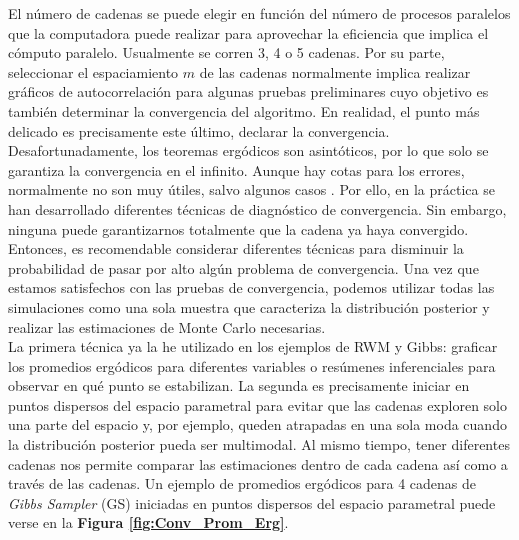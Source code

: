 El número de cadenas se puede elegir en función del número de procesos paralelos que la computadora puede realizar para aprovechar la eficiencia que implica el cómputo paralelo. Usualmente se corren 3, 4 o 5 cadenas. Por su parte, seleccionar el espaciamiento $m$ de las cadenas normalmente implica realizar gráficos de autocorrelación para algunas pruebas preliminares cuyo objetivo es también determinar la convergencia del algoritmo. En realidad, el punto más delicado es precisamente este último, declarar la convergencia.\\ 

Desafortunadamente, los teoremas ergódicos son asintóticos, por lo que solo se garantiza la convergencia en el infinito. Aunque hay cotas para los errores, normalmente no son muy útiles, salvo algunos casos \parencite{SmithRoberts93}. Por ello, en la práctica se han desarrollado diferentes técnicas de diagnóstico de convergencia. Sin embargo, ninguna puede garantizarnos totalmente que la cadena ya haya convergido. Entonces, es recomendable considerar diferentes técnicas para disminuir la probabilidad de pasar por alto algún problema de convergencia. Una vez que estamos satisfechos con las pruebas de convergencia, podemos utilizar todas las simulaciones como una sola muestra que caracteriza la distribución posterior y realizar las estimaciones de Monte Carlo necesarias.\\

La primera técnica ya la he utilizado en los ejemplos de RWM y Gibbs: graficar los promedios ergódicos para diferentes variables o resúmenes inferenciales para observar en qué punto se estabilizan. La segunda es precisamente iniciar en puntos dispersos del espacio parametral para evitar que las cadenas exploren solo una parte del espacio y, por ejemplo, queden atrapadas en una sola moda cuando la distribución posterior pueda ser multimodal. Al mismo tiempo, tener diferentes cadenas nos permite comparar las estimaciones dentro de cada cadena así como a través de las cadenas. Un ejemplo de promedios ergódicos para 4 cadenas de \textit{Gibbs Sampler} (GS) iniciadas en puntos dispersos del espacio parametral puede verse en la \textbf{Figura \ref{fig:Conv_Prom_Erg}}.\\ 

